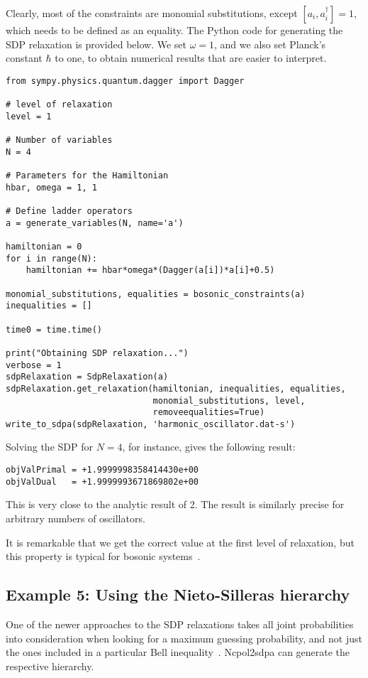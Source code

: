 \documentclass{article}
\begin{document}
Clearly, most of the constraints are monomial substitutions, except $[a_{i},a_{i}^{\dagger}]=1$, which needs to be defined as an equality. The Python code for generating the SDP relaxation is provided below. We set $\omega=1$, and we also set Planck's constant $\hbar$ to one, to obtain numerical results that are easier to interpret.
\begin{verbatim}
from sympy.physics.quantum.dagger import Dagger

# level of relaxation
level = 1

# Number of variables
N = 4

# Parameters for the Hamiltonian
hbar, omega = 1, 1

# Define ladder operators
a = generate_variables(N, name='a')

hamiltonian = 0
for i in range(N):
    hamiltonian += hbar*omega*(Dagger(a[i])*a[i]+0.5)

monomial_substitutions, equalities = bosonic_constraints(a)
inequalities = []

time0 = time.time()

print("Obtaining SDP relaxation...")
verbose = 1
sdpRelaxation = SdpRelaxation(a)
sdpRelaxation.get_relaxation(hamiltonian, inequalities, equalities,
                             monomial_substitutions, level,
                             removeequalities=True)
write_to_sdpa(sdpRelaxation, 'harmonic_oscillator.dat-s')                      
\end{verbatim}

Solving the SDP for $N=4$, for instance, gives the following result:
\begin{verbatim}
objValPrimal = +1.9999998358414430e+00
objValDual   = +1.9999993671869802e+00
\end{verbatim}
This is very close to the analytic result of 2. The result is similarly precise for arbitrary numbers of oscillators. 

It is remarkable that we get the correct value at the first level of relaxation, but this property is typical for bosonic systems~\citep{navascues2013paradox}.

\subsection{Example 5: Using the Nieto-Silleras hierarchy}
One of the newer approaches to the SDP relaxations takes all joint probabilities into consideration when looking for a maximum guessing probability, and not just the ones included in a particular Bell inequality~\citep{nieto-silleras2014using,bancal2014more}. Ncpol2sdpa can generate the respective hierarchy.
\end{document}
